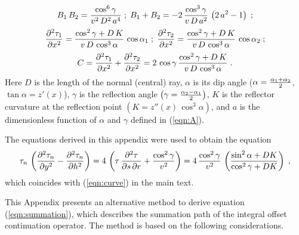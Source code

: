 \begin{equation}
B_1\,B_2  =  {\cos^6{\gamma}\over v^2\,D^2\,a^4}\;;\;
B_1+B_2 = -2\,{\cos^3{\gamma}\over v\,D\,a^2}\,\left(2\,a^2-1\right)\;;
\label{eqn:B1B2}
\end{equation}
\begin{equation}
{\partial^2 \tau_1 \over \partial x^2} =
{{\cos^2{\gamma}+D\,K}\over{v\,D\,\cos^3{\alpha}}}\,\cos{\alpha_1}\;;\;
{\partial^2 \tau_2 \over \partial x^2} =
{{\cos^2{\gamma}+D\,K}\over{v\,D\,\cos^3{\alpha}}}\,\cos{\alpha_2}\;;
\label{eqn:C1C2} 
\end{equation}
\begin{equation}
C={\partial^2 \tau_1 \over \partial x^2}+{\partial^2 \tau_2 \over \partial x^2}=
2\,\cos{\gamma}\,{{\cos^2{\gamma}+D\,K}\over{v\,D\,\cos^3{\alpha}}}\;.
\label{eqn:C}
\end{equation}
Here $D$ is the length of the normal (central) ray, $\alpha$ is its dip angle
($\alpha={{\alpha_1+\alpha_2}\over 2}$, $\tan{\alpha}=z'(x)$),
$\gamma$ is the reflection angle 
$\left(\gamma={{\alpha_2-\alpha_1}\over 2}\right)$, $K$ is the reflector 
curvature at the reflection point $\left(K=z''(x)\,\cos^3{\alpha}\right)$, and 
$a$ is the dimensionless function of $\alpha$ and $\gamma$ defined in (\ref{eqn:A}).

The equations derived in this appendix were used to obtain the equation
\begin{equation}
\tau_n\,\left({\partial^2 \tau_n \over \partial y^2}-
{\partial^2 \tau_n \over \partial h^2}\right)=
4\,\left(\tau\,{\partial^2 \tau \over \partial s\,\partial r}+
{\cos^2{\gamma}\over v^2}\right)=
4\,
{\cos^2{\gamma}\over v^2}\,\left({\sin^2{\alpha}+DK}\over
{\cos^2{\gamma}+DK}\right)\;,
\label{eqn:curved}
\end{equation}
which coincides with (\ref{eqn:curve}) in the main text.

\label{chapter:kinem}
This Appendix presents an alternative method to derive equation
(\ref{eqn:summation}), which describes the summation path of the
integral offset continuation operator. The method is based on the
following considerations.


